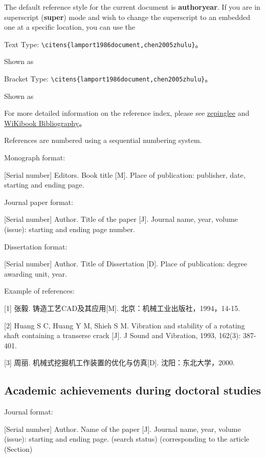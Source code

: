 The default reference style for the current document is \textbf{authoryear}. If you are in superscript (\textbf{super}) mode and wish to change the superscript to an embedded one at a specific location, you can use the

Text Type: \verb|\citens{lamport1986document,chen2005zhulu}|。

Shown as \cite{lamport1986document,chen2005zhulu}

Bracket Type: \verb|\citens{lamport1986document,chen2005zhulu}|。

Shown as \cite{lamport1986document,chen2005zhulu}

For more detailed information on the reference index, please see \href{https://github.com/zepinglee/gbt7714-bibtex-style}{zepinglee} and \href{https://en.wikibooks.org/wiki/LaTeX/Bibliography_Management}{WiKibook Bibliography}。


References are numbered using a sequential numbering system.

Monograph format:

[Serial number] Editors. Book title [M]. Place of publication: publisher, date, starting and ending page.

Journal paper format: 

[Serial number] Author. Title of the paper [J]. Journal name, year, volume (issue): starting and ending page number.

Dissertation format: 

[Serial number] Author. Title of Dissertation [D]. Place of publication: degree awarding unit, year.

Example of references:  

[1] 张毅. 铸造工艺CAD及其应用[M]. 北京：机械工业出版社，1994，14-15. 

[2] Huang S C, Huang Y M, Shieh S M. Vibration and stability of a rotating shaft containing a transerse crack [J]. J Sound and Vibration, 1993, 162(3): 387-401.

[3] 周丽. 机械式挖掘机工作装置的优化与仿真[D]. 沈阳：东北大学，2000.


\subsection{Academic achievements during doctoral studies}

Journal format:

[Serial number] Author. Name of the paper [J]. Journal name, year, volume (issue): starting and ending page. (search status) (corresponding to the article
(Section)

